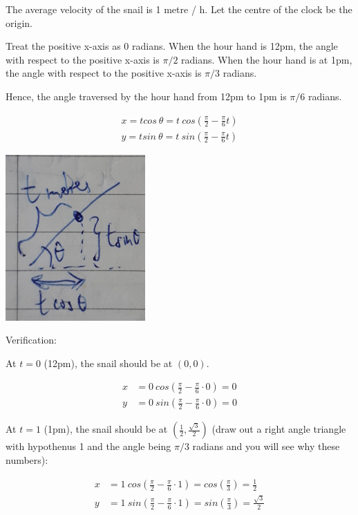 \documentclass[9pt]{article}
\begin{document}
The average velocity of the snail is 1 metre / h. Let the centre of the clock be the origin.

Treat the positive x-axis as 0 radians. When the hour hand is 12pm, the angle with respect to the positive x-axis is $\pi / 2$ radians. When the hour hand is at 1pm, the angle with respect to the positive x-axis is $\pi / 3$ radians.

Hence, the angle traversed by the hour hand from 12pm to 1pm is $\pi / 6$ radians.

\begin{align*}
  x = t cos\ \theta = t\ cos(\frac{\pi}{2} - \frac{\pi}{6}t) \\
  y = t sin\ \theta = t\ sin(\frac{\pi}{2} - \frac{\pi}{6}t)
\end{align*}

\begin{center}
  \includegraphics[scale=0.8]{p1_4e8.jpg}
\end{center}

Verification:

At $t = 0$ (12pm), the snail should be at $(0, 0)$.

\begin{align*}
  x &= 0\ cos(\frac{\pi}{2} - \frac{\pi}{6} \cdot 0) = 0 \\
  y &= 0\ sin(\frac{\pi}{2} - \frac{\pi}{6} \cdot 0) = 0
\end{align*}

At $t = 1$ (1pm), the snail should be at $(\frac{1}{2}, \frac{\sqrt{3}}{2})$ (draw out a right angle triangle with hypothenus 1 and the angle being $\pi / 3$ radians and you will see why these numbers):

\begin{align*}
  x &= 1\ cos(\frac{\pi}{2} - \frac{\pi}{6} \cdot 1) = cos(\frac{\pi}{3}) = \frac{1}{2} \\
  y &= 1\ sin(\frac{\pi}{2} - \frac{\pi}{6} \cdot 1) = sin(\frac{\pi}{3}) = \frac{\sqrt{3}}{2}
\end{align*}
\end{document}
